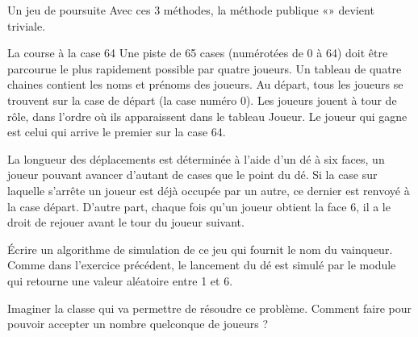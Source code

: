 \begin{Exercice}{Un jeu de poursuite}
	Avec ces 3 méthodes, la méthode publique
	«» devient triviale.
\end{Exercice}

\begin{Exercice}{La course à la case 64}
	Une piste de 65 cases (numérotées de 0 à 64)
	doit être parcourue le plus rapidement possible par quatre joueurs. Un
	tableau  de quatre chaines contient les noms et prénoms des
	joueurs. Au départ, tous les joueurs se trouvent sur la case de départ
	(la case numéro 0). Les joueurs jouent à tour de rôle, dans l’ordre où
	ils apparaissent dans le tableau Joueur. Le joueur qui gagne est celui
	qui arrive le premier sur la case 64.

	La longueur des déplacements est déterminée à
	l’aide d’un dé à six faces, un joueur pouvant avancer d’autant de cases
	que le point du dé. Si la case sur laquelle s’arrête un joueur est déjà
	occupée par un autre, ce dernier est renvoyé à la case départ. D’autre
	part, chaque fois qu’un joueur obtient la face 6, il a le droit de
	rejouer avant le tour du joueur suivant. 

	Écrire un algorithme de simulation de ce jeu
	qui fournit le nom du vainqueur. Comme dans l’exercice précédent, le
	lancement du dé est simulé par le module  qui retourne une valeur aléatoire entre 1 et 6.

	Imaginer la classe  qui va permettre
	de résoudre ce problème. Comment faire pour pouvoir accepter un nombre
	quelconque de joueurs ?
\end{Exercice}

